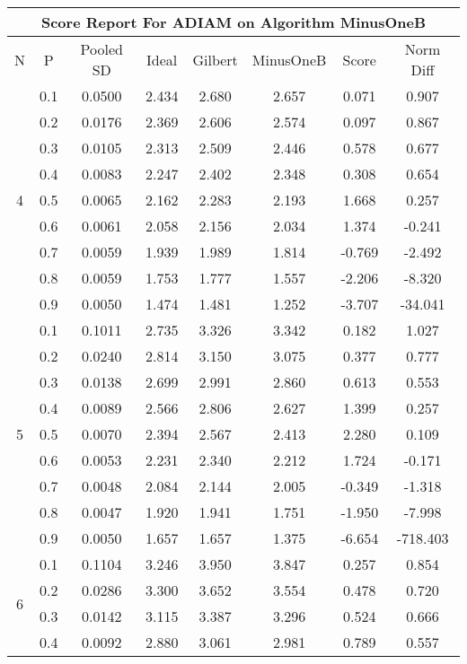 \documentclass[11pt,a4paper]{report}
\begin{document}
\begin{longtable}{ | c | c || c | c | c | c | c | c | }
\hline
\multicolumn{8}{|c|}{ Score Report For ADIAM on Algorithm MinusOneB} \\
\hline
N & P & Pooled SD &  Ideal &  Gilbert & MinusOneB  & Score & Norm Diff \\
 \hline
 \hline
 \endhead
\multirow{9}{*}{4} & 0.1 & 0.0500 & 2.434 & 2.680 & 2.657 & 0.071 & 0.907 \\
 & 0.2 & 0.0176 & 2.369 & 2.606 & 2.574 & 0.097 & 0.867 \\
 & 0.3 & 0.0105 & 2.313 & 2.509 & 2.446 & 0.578 & 0.677 \\
 & 0.4 & 0.0083 & 2.247 & 2.402 & 2.348 & 0.308 & 0.654 \\
 & 0.5 & 0.0065 & 2.162 & 2.283 & 2.193 & 1.668 & 0.257 \\
 & 0.6 & 0.0061 & 2.058 & 2.156 & 2.034 & 1.374 & -0.241 \\
 & 0.7 & 0.0059 & 1.939 & 1.989 & 1.814 & -0.769 & -2.492 \\
 & 0.8 & 0.0059 & 1.753 & 1.777 & 1.557 & -2.206 & -8.320 \\
 & 0.9 & 0.0050 & 1.474 & 1.481 & 1.252 & -3.707 & -34.041 \\
 \hline
\multirow{9}{*}{5} & 0.1 & 0.1011 & 2.735 & 3.326 & 3.342 & 0.182 & 1.027 \\
 & 0.2 & 0.0240 & 2.814 & 3.150 & 3.075 & 0.377 & 0.777 \\
 & 0.3 & 0.0138 & 2.699 & 2.991 & 2.860 & 0.613 & 0.553 \\
 & 0.4 & 0.0089 & 2.566 & 2.806 & 2.627 & 1.399 & 0.257 \\
 & 0.5 & 0.0070 & 2.394 & 2.567 & 2.413 & 2.280 & 0.109 \\
 & 0.6 & 0.0053 & 2.231 & 2.340 & 2.212 & 1.724 & -0.171 \\
 & 0.7 & 0.0048 & 2.084 & 2.144 & 2.005 & -0.349 & -1.318 \\
 & 0.8 & 0.0047 & 1.920 & 1.941 & 1.751 & -1.950 & -7.998 \\
 & 0.9 & 0.0050 & 1.657 & 1.657 & 1.375 & -6.654 & -718.403 \\
 \hline
\multirow{9}{*}{6} & 0.1 & 0.1104 & 3.246 & 3.950 & 3.847 & 0.257 & 0.854 \\
 & 0.2 & 0.0286 & 3.300 & 3.652 & 3.554 & 0.478 & 0.720 \\
 & 0.3 & 0.0142 & 3.115 & 3.387 & 3.296 & 0.524 & 0.666 \\
 & 0.4 & 0.0092 & 2.880 & 3.061 & 2.981 & 0.789 & 0.557 \\

\end{longtable}
\end{document}
